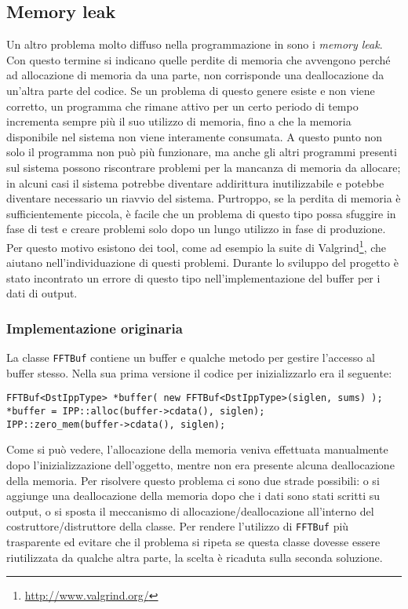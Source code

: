 \subsection{Memory leak}
Un altro problema molto diffuso nella programmazione in \CC sono i \emph{memory
leak}. Con questo termine si indicano quelle perdite di memoria che avvengono
perch\'e ad allocazione di memoria da una parte, non corrisponde una
deallocazione da un'altra parte del codice. Se un problema di questo genere
esiste e non viene corretto, un programma che rimane attivo per un certo periodo
di tempo incrementa sempre pi\`u il suo utilizzo di memoria, fino a che la
memoria disponibile nel sistema non viene interamente consumata. A questo punto
non solo il programma non pu\`o pi\`u funzionare, ma anche gli altri programmi
presenti sul sistema possono riscontrare problemi per la mancanza di memoria da
allocare; in alcuni casi il sistema potrebbe diventare addirittura
inutilizzabile e potebbe diventare necessario un riavvio del sistema. Purtroppo,
se la perdita di memoria \`e sufficientemente piccola, \`e facile che un
problema di questo tipo possa sfuggire in fase di test e creare problemi solo
dopo un lungo utilizzo in fase di produzione. Per questo motivo esistono dei
tool, come ad esempio la suite di
Valgrind\footnote{\url{http://www.valgrind.org/}}, che aiutano
nell'individuazione di questi problemi. Durante lo sviluppo del progetto \`e
stato incontrato un errore di questo tipo nell'implementazione del buffer per i
dati di output.

\subsubsection{Implementazione originaria}
La classe \texttt{FFTBuf} contiene un buffer e qualche metodo per gestire
l'accesso al buffer stesso. Nella sua prima versione il codice per
inizializzarlo era il seguente:
\begin{lstlisting}[caption=Inizializzazione di un FFTBuf (vecchia
versione),label=lst:old_fftbuf]
FFTBuf<DstIppType> *buffer( new FFTBuf<DstIppType>(siglen, sums) );
*buffer = IPP::alloc(buffer->cdata(), siglen);
IPP::zero_mem(buffer->cdata(), siglen);
\end{lstlisting}
Come si pu\`o vedere, l'allocazione della memoria veniva effettuata manualmente
dopo l'inizializzazione dell'oggetto, mentre non era presente alcuna
deallocazione della memoria. Per risolvere questo problema ci sono due strade
possibili: o si aggiunge una deallocazione della memoria dopo che i dati sono
stati scritti su output, o si sposta il meccanismo di allocazione/deallocazione
all'interno del costruttore/distruttore della classe. Per rendere l'utilizzo di
\texttt{FFTBuf} pi\`u trasparente ed evitare che il problema si ripeta se questa
classe dovesse essere riutilizzata da qualche altra parte, la scelta \`e
ricaduta sulla seconda soluzione.

